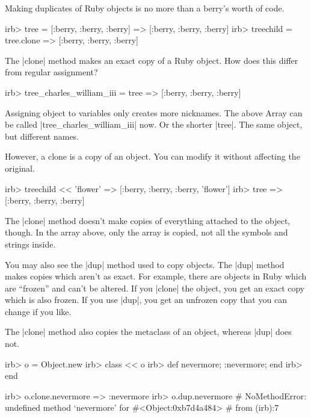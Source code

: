\documentclass[12pt,twoside]{report}
\begin{document}
Making duplicates of Ruby objects is no more than a berry's worth of
code.


\begin{consolecode}

 irb> tree = [:berry, :berry, :berry]
   => [:berry, :berry, :berry]
 irb> treechild = tree.clone
   => [:berry, :berry, :berry]

\end{consolecode}


The \rubyinline|clone| method makes an exact copy of a
Ruby object.  How does this differ from regular assignment?


\begin{consolecode}

 irb> tree_charles_william_iii = tree
   => [:berry, :berry, :berry]

\end{consolecode}


Assigning object to variables only creates more nicknames.  The above
Array can be called
\rubyinline|tree_charles_william_iii| now.  Or the
shorter \rubyinline|tree|.  The same object, but
different names.

However, a clone is a copy of an object.  You can modify it without
affecting the original.


\begin{consolecode}

 irb> treechild << 'flower'
   => [:berry, :berry, :berry, 'flower']
 irb> tree
   => [:berry, :berry, :berry]

\end{consolecode}


The \rubyinline|clone| method doesn't make copies of
everything attached to the object, though.  In the array above, only
the array is copied, not all the symbols and strings inside.

You may also see the \rubyinline|dup| method used to
copy objects.  The \rubyinline|dup| method makes
copies which aren't as exact.  For example, there are objects in Ruby
which are ``frozen'' and can't be altered.  If you
\rubyinline|clone| the object, you get an exact copy
which is also frozen.  If you use \rubyinline|dup|,
you get an unfrozen copy that you can change if you like.

The \rubyinline|clone| method also copies the
metaclass of an object, whereas \rubyinline|dup| does
not.


\begin{consolecode}

 irb> o = Object.new
 irb> class << o
 irb>   def nevermore; :nevermore; end
 irb> end

 irb> o.clone.nevermore
   => :nevermore
 irb> o.dup.nevermore
 # NoMethodError: undefined method `nevermore' for #<Object:0xb7d4a484>
 #         from (irb):7

\end{consolecode}
\end{document}

